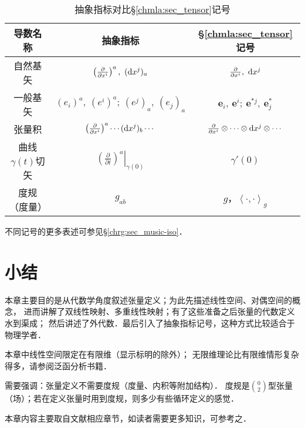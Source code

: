 \begin{table}[htb]
    \centering
    \caption{抽象指标对比\S\ref{chmla:sec_tensor}记号} \label{chmla:tab-aivscc}
    \begin{tabular}{|*3{c|}}
        \hline
        导数名称 & 抽象指标 & \S\ref{chmla:sec_tensor}记号 \\ 
        \hline
        自然基矢 & $\left(\frac{\partial}{\partial x^i} \right)^a,\  ({\rm d}x^j)_a$ 
                 & $\frac{\partial}{\partial x^i}, \  {\rm d}x^j$    \\ 
        \hline
        一般基矢 & $(e_i)^a,\ (e^i)^a;\ (e^j)_a,\ (e_j)_a$ &  $\boldsymbol{e}_i,\ \boldsymbol{e}^i;\ 
        \boldsymbol{e}^{*j},\  \boldsymbol{e}^{*}_{j} $    \\ 
        \hline
        张量积   & $\left(\frac{\partial}{\partial x^i} \right)^a \cdots ({\rm d}x^j)_b \cdots $ 
                   &  $\frac{\partial}{\partial x^i}\otimes \cdots\otimes
                   {\rm d}x^j \otimes \cdots$    \\ 
        \hline        
        曲线$\gamma(t)$切矢 & $\left.\left(\frac{\partial}{\partial t} \right)^a \right|_{\gamma(0)} $ 
          & $\gamma'(0)$  \\ 
        \hline
        度规（度量） & $g_{ab}$ & $g$，$\left<\cdot ,\cdot \right>_{g}$ \\ \hline
    \end{tabular}
\end{table}

\begin{remark}
	不同记号的更多表述可参见\S\ref{chrg:sec_music-iso}．
\end{remark}



\section*{小结}


本章主要目的是从代数学角度叙述张量定义；为此先描述线性空间、对偶空间的概念，
进而讲解了双线性映射、多重线性映射；有了这些准备之后张量的代数定义水到渠成；
然后讲述了外代数．最后引入了抽象指标记号，这种方式比较适合于物理学者．

本章中线性空间限定在有限维（显示标明的除外）；
无限维理论比有限维情形复杂得多，请参阅泛函分析书籍．

需要强调：张量定义不需要度规（度量、内积等附加结构）．
度规是$\binom{0}{2}$型张量（场）；若在定义张量时用到度规，则多少有些循环定义的感觉．

本章内容主要取自文献\parencite{qiuws-2019-v2}相应章节，如读者需要更多知识，可参考之．

\printbibliography[heading=subbibliography,title=第\ref{chmla}章参考文献]
\endinput


